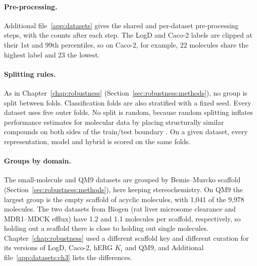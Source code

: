 \paragraph{Pre-processing.} Additional file~\ref{app:datasets} gives the shared and per-dataset pre-processing steps, with the counts after each step. The LogD and Caco-2 labels are clipped at their 1st and 99th percentiles, so on Caco-2, for example, 22 molecules share the highest label and 23 the lowest.


\paragraph{Splitting rules.} As in Chapter~\ref{chap:robustness} (Section~\ref{sec:robustness:methods}), no group is split between folds. Classification folds are also stratified with a fixed seed. Every dataset uses five outer folds. No split is random, because random splitting inflates performance estimates for molecular data by placing structurally similar compounds on both sides of the train/test boundary \citep{Yang2019, Wallach2018}. On a given dataset, every representation, model and hybrid is scored on the same folds.

\paragraph{Groups by domain.} The small-molecule and QM9 datasets are grouped by Bemis--Murcko scaffold (Section~\ref{sec:robustness:methods}), here keeping stereochemistry. On QM9 the largest group is the empty scaffold of acyclic molecules, with 1,041 of the 9,978 molecules. The two datasets from Biogen \citep{fang2023} (rat liver microsome clearance and MDR1--MDCK efflux) have 1.2 and 1.1 molecules per scaffold, respectively, so holding out a scaffold there is close to holding out single molecules. Chapter~\ref{chap:robustness} used a different scaffold key and different curation for its versions of LogD, Caco-2, hERG $K_i$ and QM9, and Additional file~\ref{app:datasets:ch3} lists the differences.

